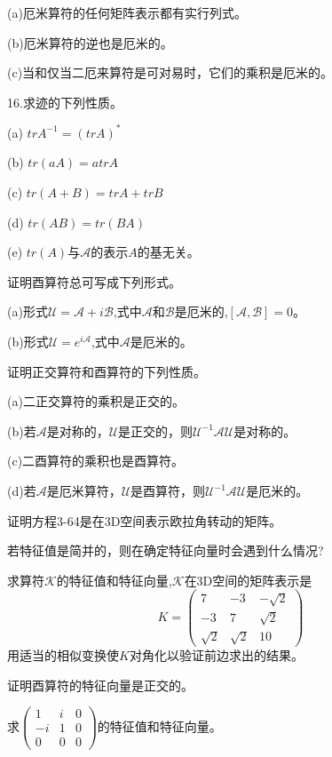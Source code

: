 \begin{problemset}
(a)厄米算符的任何矩阵表示都有实行列式。

(b)厄米算符的逆也是厄米的。

(c)当和仅当二厄来算符是可对易时，它们的乘积是厄米的。

16.求迹的下列性质。

(a) $trA^{-1}=(trA)^*$

(b) $tr(aA)=atrA$

(c) $tr(A+B)=trA+trB$

(d) $tr(AB)=tr(BA)$

(e) $tr(A)$与$\mathscr{A}$的表示$A$的基无关。
\item 证明酉算符总可写成下列形式。

(a)形式$\mathscr{U}=\mathscr{A}+i\mathscr{B}$,式中$\mathscr{A}$和$\mathscr{B}$是厄米的,$[\mathscr{A},\mathscr{B}]=0$。

(b)形式$\mathscr{U}=e^{i\mathscr{A}}$,式中$\mathscr{A}$是厄米的。
\item 证明正交算符和酉算符的下列性质。

(a)二正交算符的乘积是正交的。

(b)若$\mathscr{A}$是对称的，$\mathscr{U}$是正交的，则$\mathscr{U}^{-1}\mathscr{A}\mathscr{U}$是对称的。

(c)二酉算符的乘积也是酉算符。

(d)若$\mathscr{A}$是厄米算符，$\mathscr{U}$是酉算符，则$\mathscr{U}^{-1}\mathscr{A}\mathscr{U}$是厄米的。
\item 证明方程3-64是在3D空间表示欧拉角转动的矩阵。
\item 若特征值是简并的，则在确定特征向量时会遇到什么情况?
\item 求算符$\mathscr{K}$的特征值和特征向量,$\mathscr{K}$在3D空间的矩阵表示是
\[
K=
\begin{pmatrix}
    7 & -3 & -\sqrt{2} \\ -3 & 7 & \sqrt{2} \\ \sqrt{2} & \sqrt{2} & 10
\end{pmatrix}
\]
用适当的相似变换使$K$对角化以验证前边求出的结果。
\item 证明酉算符的特征向量是正交的。
\item 求$\begin{pmatrix}1 & i & 0 \\ -i & 1 & 0 \\ 0 & 0 & 0\end{pmatrix}$的特征值和特征向量。
\end{problemset}